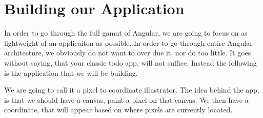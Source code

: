 \maketitle{}
\section{ Building our Application }

In order to go through the full gamut of Angular, we are going to focus on as
lightweight of an applicaiton as possible. In order to go through entire Angular
architecture, we obviously do not want to over due it, nor do too little. It
goes without saying, that your classic todo app, will not suffice. Instead the
following is the application that we will be building.

We are going to call it a pixel to coordinate illustrator. The idea behind the
app, is that we should have a canvas, paint a pixel on that canvas. We then have
a coordinate, that will appear based on where pixels are currently located.
